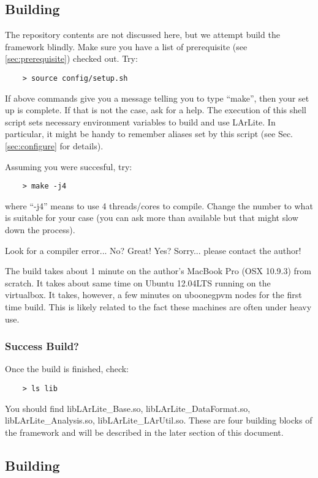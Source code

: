 
\subsection{Building \Core}

The repository contents are not discussed here, but we attempt build the framework blindly.
Make sure you have a list of prerequisite (see \ref{sec:prerequisite}) checked out.
Try:
\begin{lstlisting}
    > source config/setup.sh
\end{lstlisting}

If above commands give you a message telling you to type ``make'', then your set up is complete.
If that is not the case, ask for a help. The execution of this shell script sets necessary
environment variables to build and use LArLite. In particular, it might be handy to remember 
aliases set by this script (see Sec.\ref{sec:configure} for details).

Assuming you were succesful, try:
\begin{lstlisting}
    > make -j4
\end{lstlisting}

where ``-j4'' means to use 4 threads/cores to compile. 
Change the number to what is suitable for your case (you can ask more than available but that might slow down the process).

Look for a compiler error... No? Great! Yes? Sorry... please contact the author!

The build takes about 1 minute on the author's MacBook Pro (OSX 10.9.3) from scratch. 
It takes about same time on Ubuntu 12.04LTS running on the virtualbox. 
It takes, however, a few minutes on uboonegpvm nodes for the first time build.
This is likely related to the fact these machines are often under heavy use.

\subsubsection{Success Build?}

Once the build is finished, check:
\begin{lstlisting}
    > ls lib
\end{lstlisting}
You should find {\ttfamily libLArLite\_Base.so, libLArLite\_DataFormat.so, libLArLite\_Analysis.so, libLArLite\_LArUtil.so}. These are four building blocks of the framework and will be described in the later section of this document.  

\subsection{Building \UserDev}

